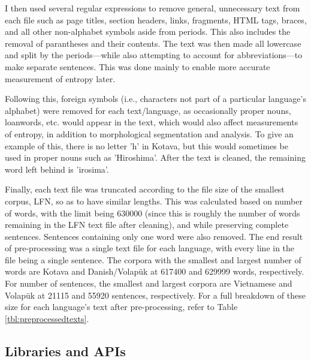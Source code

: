 \documentclass[12pt,a4paper]{article}
\numberwithin{figure}{section}
\numberwithin{table}{section}
\numberwithin{definition}{section}
\begin{document}
I then used several regular expressions to remove general, unnecessary text from each file such as page titles, section headers, links, fragments, HTML tags, braces, and all other non-alphabet symbols aside from periods. This also includes the removal of parantheses and their contents. The text was then made all lowercase and split by the periods---while also attempting to account for abbreviations---to make separate sentences. This was done mainly to enable more accurate measurement of entropy later.

Following this, foreign symbols (i.e., characters not part of a particular language's alphabet) were removed for each text/language, as occasionally proper nouns, loanwords, etc. would appear in the text, which would also affect measurements of entropy, in addition to morphological segmentation and analysis. To give an example of this, there is no letter 'h' in Kotava, but this would sometimes be used in proper nouns such as 'Hiroshima'. After the text is cleaned, the remaining word left behind is 'irosima'. 

Finally, each text file was truncated according to the file size of the smallest corpus, LFN, so as to have similar lengths. This was calculated based on number of words, with the limit being 630000 (since this is roughly the number of words remaining in the LFN text file after cleaning), and while preserving complete sentences. Sentences containing only one word were also removed. The end result of pre-processing was a single text file for each language, with every line in the file being a single sentence. The corpora with the smallest and largest number of words are Kotava and Danish/Volapük at 617400 and 629999 words, respectively. For number of sentences, the smallest and largest corpora are Vietnamese and Volapük at 21115 and 55920 sentences, respectively. For a full breakdown of these size for each language's text after pre-processing, refer to Table \ref{tbl:preprocessedtexts}.

\subsection{Libraries and APIs}
\label{ssec:librariesandapis}
\end{document}
